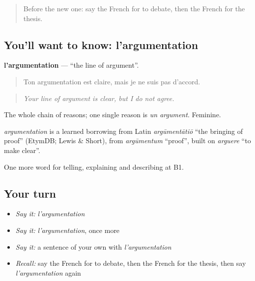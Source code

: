 \begin{quote}
Before the new one: say the French for to debate, then the French for the thesis.
\end{quote}

\subsection*{You'll want to know: l'argumentation}
\textbf{l'argumentation} — \textquotedblleft{}the line of argument\textquotedblright{}.

\begin{quote}
Ton argumentation est claire, mais je ne suis pas d'accord.
\end{quote}

\begin{quote}
\emph{Your line of argument is clear, but I do not agree.}
\end{quote}

The whole chain of reasons; one single reason is \emph{un argument}. Feminine.

\begin{cousinweb}
\emph{argumentation} is a learned borrowing from Latin \emph{argūmentātiō} \textquotedblleft{}the bringing of proof\textquotedblright{} (EtymDB; Lewis \& Short), from \emph{argūmentum} \textquotedblleft{}proof\textquotedblright{}, built on \emph{arguere} \textquotedblleft{}to make clear\textquotedblright{}.
\end{cousinweb}

\begin{grammarlens}[title={What you've built}]
One more word for telling, explaining and describing at B1.
\end{grammarlens}

\subsection*{Your turn}
\begin{itemize}
\raggedright
  \item \emph{Say it:} \emph{l'argumentation}
  \item \emph{Say it:} \emph{l'argumentation}, once more
  \item \emph{Say it:} a sentence of your own with \emph{l'argumentation}
  \item \emph{Recall:} say the French for to debate, then the French for the thesis, then say \emph{l'argumentation} again
\end{itemize}

